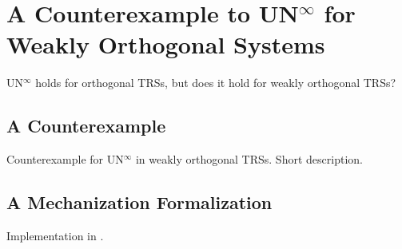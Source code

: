 \chapter{A Counterexample to UN\texorpdfstring{$^\infty$}{} for Weakly
  Orthogonal Systems}\label{chap:unwo}

UN$^\infty$ holds for orthogonal TRSs, but does it hold for weakly orthogonal TRSs?


\section{A Counterexample}

Counterexample for UN$^\infty$ in weakly orthogonal TRSs. Short description.


\section{A Mechanization Formalization}

Implementation in \Coq.
